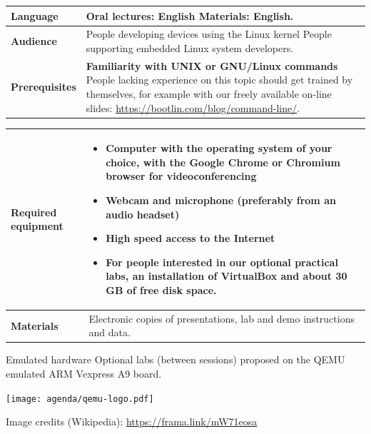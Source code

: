 \documentclass[a4paper,12pt,obeyspaces,spaces,hyphens]{article}
\begin{document}
{\begin{tabularx}{\textwidth}{|g|h|}
    {\bf Language} & Oral lectures: English
    \newline Materials: English.\\
    \hline

    {\bf Audience} & People developing devices using the Linux kernel
    \newline People supporting embedded Linux system developers. \\
    \hline

    {\bf Prerequisites} &
    {\bf Familiarity with UNIX or GNU/Linux commands}
    \newline People lacking experience on this topic should get
    trained by themselves, for example with our freely available
    on-line slides:
    \newline \url{https://bootlin.com/blog/command-line/}. \\
    \hline

  \end{tabularx}

  \begin{tabularx}{\textwidth}{|g|h|}
    {\bf Required equipment} &
    \begin{itemize}
    \item Computer with the operating system of your choice, with the
          Google Chrome or Chromium browser for videoconferencing
    \item Webcam and microphone (preferably from an audio headset)
    \item High speed access to the Internet
    \item For people interested in our optional practical labs,
          an installation of VirtualBox and about 30 GB of free
          disk space.
    \end{itemize}\\
    \hline

    {\bf Materials} & Electronic copies of presentations,
    lab and demo instructions and data.\\
    \hline

\end{tabularx}}
\normalsize

\feagendatwocolumn
{Emulated hardware}
{
  Optional labs (between sessions) proposed on the QEMU emulated
  ARM Vexpress A9 board.
}
{}
{
  \begin{center}
    \texttt{[image: agenda/qemu-logo.pdf]}
  \end{center}
  \scriptsize Image credits (Wikipedia): \url{https://frama.link/mW71eosa}
}
\end{document}
